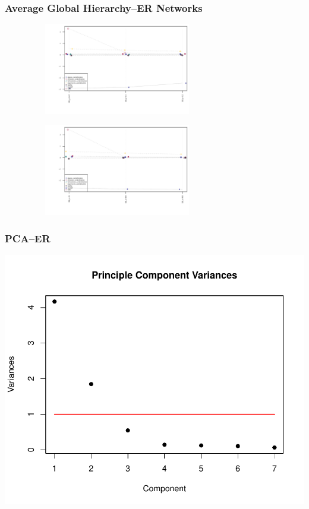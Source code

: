 \documentclass[xcolor={table}]{beamer}
\newenvironment{changemargin}[2]{%
  \begin{list}{}{%
    \setlength{\topsep}{0pt}%
    \setlength{\leftmargin}{#1}%
    \setlength{\rightmargin}{#2}%
    \setlength{\listparindent}{\parindent}%
    \setlength{\itemindent}{\parindent}%
    \setlength{\parsep}{\parskip}%
  }%
  \item[]}{\end{list}}
\begin{document}
\begin{frame}\frametitle{Average Global Hierarchy--ER Networks}
	\begin{changemargin}{-2cm}{ -2cm}
		\centering
		\par
		\includegraphics[width=10cm, height=4cm]{images/ER_Param_Averages.pdf}
		\\
		\vspace{-5mm}
		\par
		\includegraphics[width=10cm, height=4cm]{images/ER_Size_Averages.pdf}
	\end{changemargin}
\end{frame}

\begin{frame}\frametitle{PCA--ER}
	\begin{changemargin}{-2cm}{ -2cm}
		\centering
		\includegraphics[scale = 0.6]{images/ER_Param_PCA_Component_Varinces.pdf}
	\end{changemargin}
\end{frame}
\end{document}
